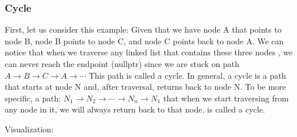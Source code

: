 \documentclass[12pt, letterpaper]{article}
\begin{document}
\subsubsection{Cycle}
First, let us consider this example: Given that we have node A that points to node B, node B points to node C, and node C points back to node A. We can notice that when we traverse any linked list that contains these three nodes , we can never reach the endpoint (nullptr) since we are stuck on path \( A \rightarrow B \rightarrow C \rightarrow A\rightarrow \cdots \) This path is called a cycle.
In general, a cycle is a path that starts at node N and, after traversal, returns back to node N. To be more specific, a path: \( N_1 \rightarrow N_2 \rightarrow \cdots \rightarrow N_n \rightarrow N_1 \) that when we start traversing from any node in it, we will always return back to that node, is called a cycle.

Visualization:
\end{document}

